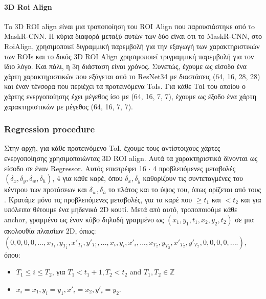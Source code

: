 \documentclass{report}
\begin{document}
\paragraph{3D Roi Align}
To  3D ROI align είναι μια τροποποίηση του ROI Align που παρουσιάστηκε από τo MaskR-CNN. Η κύρια διαφορά μεταξύ αυτών των δύο είναι ότι το MaskR-CNN, στο RoiAlign,  χρησιμοποιεί
διγραμμική παρεμβολή για την εξαγωγή των χαρακτηριστικών των ROIs και το δικός 3D ROI Align χρησιμοποιεί τριγραμμική παρεμβολή για τον ίδιο λόγο. Και πάλι, η 3η διάσταση είναι
χρόνος.
Συνεπώς, έχουμε ως είσοδο ένα χάρτη χαρακτηριστικών που εξάγεται από το  ResNet34 με διαστάσεις (64, 16, 28, 28) και έναν τένσορα που περιέχει τα προτεινόμενα ToIs.
Για κάθε ΤοΙ του οποίου ο χάρτης ενεργοποίησης έχει μέγεθος ίσο με (64, 16, 7, 7), έχουμε ως έξοδο ένα χάρτη χαρακτηριστικών με μέγεθος (64, 16, 7, 7).  \par

\subsubsection{Regression procedure}
Στην αρχή, για κάθε προτεινόμενο ToI, έχουμε τους αντίστοιχους χάρτες ενεργοποίησης χρησιμοποιώντας 3D ROI align. Αυτά τα χαρακτηριστικά δίνονται ως είσοδο σε έναν Regressor.
Αυτός επιστρέφει 16 $\cdot$ 4 προβλεπόμενες μεταβολές $(\delta_x,\delta_y, \delta_w,\delta_h)$, 4 για κάθε καρέ, όπου $ \delta_x, \delta_y$ καθορίζουν τις συντεταγμένες του κέντρου των προτάσεων και
$\delta_w, \delta_h$ το πλάτος και το ύψος του, όπως ορίζεται από τους \cite{DBLP:journals/corr/GirshickDDM13}.  Κρατάμε μόνο τις προβλεπόμενες μεταβολές, για τα καρέ που $\ge t_1$ και $< t_2$ και για υπόλειπα θέτουμε ένα μηδενικό 2D κουτί. 
Μετά από αυτό, τροποποιούμε κάθε anchor, γραμμένο ως έναν κύβο δηλαδή γραμμένο ως $(x_1,y_1,t_1, x_2, y_2, t_2)$ σε μια ακολουθία πλαισίων 2D, όπως: \\
$(0,0,0,0, ..., x_{T_1},y_{T_1},x'_{T_1},y'_{T_1}, ... ,x_{i},y_{i},x'_{i}, ..., x_{T_2},y_{T_2},x'_{T_2},y'_{T_2}, 0,0,0,0, ....)$, \\
όπου:
\begin{itemize}
\item $ T_1 \le i \le T_2$, για $T_1 < t_1 + 1,  T_2 < t_2 \text{ and }T_1,T_2 \in \mathbb{Z} $
\item $ x_i = x_1, y_i= y_1, x'_i = x_2, y'_i = y_2 $.
\end{itemize}
\end{document}
